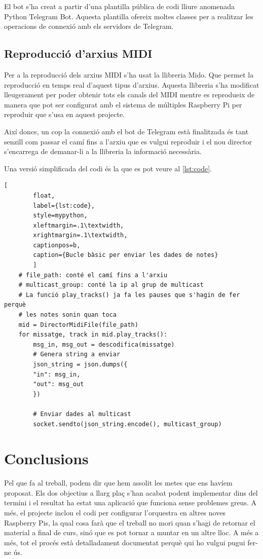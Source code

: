 \documentclass[a4paper]{paper}
\let\oldsection\section
\renewcommand\section{\clearpage\oldsection}
\begin{document}
El bot s'ha creat a partir d'una plantilla pública de codi lliure anomenada Python Telegram Bot\cite{python-telegram-bot}. Aquesta plantilla ofereix moltes classes per a realitzar les operacions de connexió amb els servidors de Telegram.

\subsection{Reproducció d'arxius MIDI}
Per a la reproducció dels arxius MIDI s'ha usat la llibreria Mido\cite{mido}. Que permet la reproducció en temps real d'aquest tipus d'arxius. Aquesta llibreria s'ha modificat lleugerament per poder obtenir tots els canals del MIDI mentre es reprodueix de manera que pot ser configurat amb el sistema de múltiples Raspberry Pi per reproduir que s'usa en aquest projecte.

Així doncs, un cop la connexió amb el bot de Telegram està finalitzada és tant senzill com passar el camí fins a l'arxiu que es vulgui reproduir i el nou director s'encarrega de demanar-li a la llibreria la informació necessària.

Una versió simplificada del codi és la que es pot veure al \autoref{lst:code}.
\begin{lstlisting}[
		float,
		label={lst:code},
		style=mypython, 
		xleftmargin=.1\textwidth, 
		xrightmargin=.1\textwidth,
		captionpos=b,
		caption={Bucle bàsic per enviar les dades de notes}
		]
	# file_path: conté el camí fins a l'arxiu
	# multicast_group: conté la ip al grup de multicast
	# La funció play_tracks() ja fa les pauses que s'hagin de fer perquè
	# les notes sonin quan toca
	mid = DirectorMidiFile(file_path)
	for missatge, track in mid.play_tracks():
		msg_in, msg_out = descodifica(missatge)
		# Genera string a enviar
		json_string = json.dumps({
		"in": msg_in,
		"out": msg_out
		})
	
		# Enviar dades al multicast
		socket.sendto(json_string.encode(), multicast_group)
\end{lstlisting}	

\section{Conclusions}
Pel que fa al treball, podem dir que hem assolit les metes que ens havíem proposat. Els dos objectius a llarg plaç s'han acabat podent implementar dins del termini i el resultat ha estat una aplicació que funciona sense problemes greus. A més, el projecte inclou el codi per configurar l'orquestra en altres noves Raspberry Pis, la qual cosa farà que el treball no mori quan s'hagi de retornar el material a final de curs, sinó que es pot tornar a muntar en un altre lloc. A més a més, tot el procés està detalladament documentat perquè qui ho vulgui pugui fer-ne ús.
\end{document}
